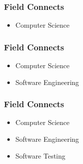 
\begin{frame}
  \frametitle{Field Connects}
  \begin{itemize}
    \item {Computer Science}
  \end{itemize}
\end{frame}

\begin{frame}
  \frametitle{Field Connects}
  \begin{itemize}
    \item {Computer Science}
    \item {Software Engineering}
  \end{itemize}
\end{frame}

\begin{frame}
  \frametitle{Field Connects}
  \begin{itemize}
    \item {Computer Science}
    \item {Software Engineering}
    \item {Software Testing}
  \end{itemize}
\end{frame}

